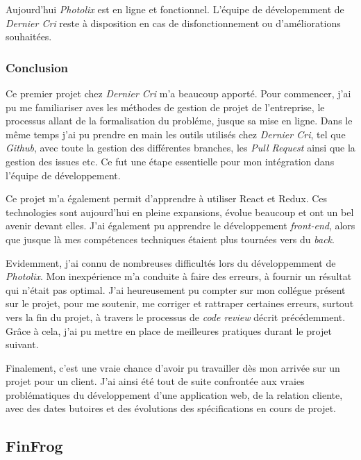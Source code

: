 \bigskip

Aujourd'hui \emph{Photolix} est en ligne et fonctionnel. L'équipe de
dévelopemment de \emph{Dernier Cri} reste à disposition en cas de
disfonctionnement ou d'améliorations souhaitées.

\subsubsection{Conclusion}\label{conclusion}

\bigskip

Ce premier projet chez \emph{Dernier Cri} m'a beaucoup apporté. Pour
commencer, j'ai pu me familiariser aves les méthodes de gestion de
projet de l'entreprise, le processus allant de la formalisation du
probléme, jusque sa mise en ligne. Dans le même temps j'ai pu prendre en
main les outils utilisés chez \emph{Dernier Cri}, tel que \emph{Github},
avec toute la gestion des différentes branches, les \emph{Pull Request}
ainsi que la gestion des issues etc. Ce fut une étape essentielle pour
mon intégration dans l'équipe de développement.

\bigskip

Ce projet m'a également permit d'apprendre à utiliser React et Redux.
Ces technologies sont aujourd'hui en pleine expansions, évolue beaucoup
et ont un bel avenir devant elles. J'ai également pu apprendre le
développement \emph{front-end}, alors que jusque là mes compétences
techniques étaient plus tournées vers du \emph{back}.

\bigskip

Evidemment, j'ai connu de nombreuses difficultés lors du développemment
de \emph{Photolix}. Mon inexpérience m'a conduite à faire des erreurs, à
fournir un résultat qui n'était pas optimal. J'ai heureusement pu
compter sur mon collégue présent sur le projet, pour me soutenir, me
corriger et rattraper certaines erreurs, surtout vers la fin du projet,
à travers le processus de \emph{code review} décrit précédemment. Grâce
à cela, j'ai pu mettre en place de meilleures pratiques durant le projet
suivant.

\bigskip

Finalement, c'est une vraie chance d'avoir pu travailler dès mon arrivée
sur un projet pour un client. J'ai ainsi été tout de suite confrontée
aux vraies problématiques du développement d'une application web, de la
relation cliente, avec des dates butoires et des évolutions des
spécifications en cours de projet.

\subsection{FinFrog}\label{finfrog}

